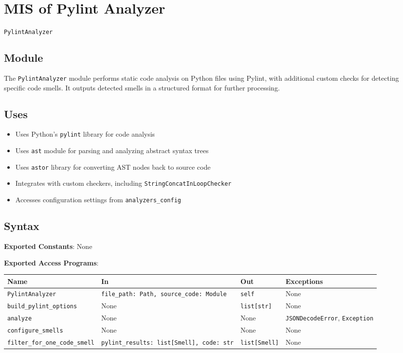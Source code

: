 \documentclass[12pt, titlepage]{article}
\begin{document}
  
\newpage
\section{MIS of Pylint Analyzer} \label{mis:PylintAnalyzer}

\texttt{PylintAnalyzer}

\subsection{Module}

The \texttt{PylintAnalyzer} module performs static code analysis on Python files using Pylint, with additional custom checks for detecting specific code smells. It outputs detected smells in a structured format for further processing.

\subsection{Uses}
\begin{itemize}
\item Uses Python's \texttt{pylint} library for code analysis
\item Uses \texttt{ast} module for parsing and analyzing abstract syntax trees
\item Uses \texttt{astor} library for converting AST nodes back to source code
\item Integrates with custom checkers, including \texttt{StringConcatInLoopChecker}
\item Accesses configuration settings from \texttt{analyzers\_config}
\end{itemize}

\subsection{Syntax}
\noindent
\textbf{Exported Constants}: None

\noindent
\textbf{Exported Access Programs}:\\
{\footnotesize
\begin{tabularx}{\linewidth}{|
    l|
    >{\raggedright\arraybackslash}X|
    l|
    l|}
  \hline
  \textbf{Name} & \textbf{In} & \textbf{Out} & \textbf{Exceptions} \\\hline
  \texttt{PylintAnalyzer} & \texttt{file\_path: Path, source\_code: Module} & \texttt{self} & None \\
  \hline
  \texttt{build\_pylint\_options} & None & \texttt{list[str]} & None \\
  \hline
  \texttt{analyze} & None & None & \texttt{JSONDecodeError}, \texttt{Exception} \\
  \hline
  \texttt{configure\_smells} & None & None & None \\
  \hline
  \texttt{filter\_for\_one\_code\_smell} & \texttt{pylint\_results: list[Smell], code: str} & \texttt{list[Smell]} & None \\
  \hline
\end{tabularx}
}
\end{document}
